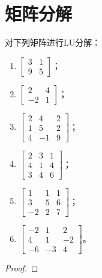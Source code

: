 \section{矩阵分解}

\begin{problem}
对下列矩阵进行LU分解：
\begin{enumerate}
    \item \(\begin{bmatrix}3&1\\9&5\end{bmatrix}\)；
    \item \(\begin{bmatrix}2&4\\-2&1\end{bmatrix}\)；
    \item \(\begin{bmatrix}2&4&2\\1&5&2\\4&-1&9\end{bmatrix}\)；
    \item \(\begin{bmatrix}2&3&1\\4&1&4\\3&4&6\end{bmatrix}\)；
    \item \(\begin{bmatrix}1&1&1\\3&5&6\\-2&2&7\end{bmatrix}\)；
    \item \(\begin{bmatrix}-2&1&2\\4&1&-2\\-6&-3&4\end{bmatrix}\)。
\end{enumerate}
\end{problem}
\begin{proof}
\end{proof}

